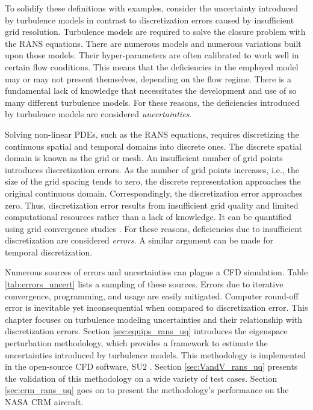 To solidify these definitions with examples, consider the uncertainty introduced by turbulence models in contrast to discretization errors caused by insufficient grid resolution.
Turbulence models are required to solve the closure problem with the RANS equations.
There are numerous models and numerous variations built upon those models. 
Their hyper-parameters are often calibrated to work well in certain flow conditions.
This means that the deficiencies in the employed model may or may not present themselves, depending on the flow regime.
There is a fundamental lack of knowledge that necessitates the development and use of so many different turbulence models.
For these reasons, the deficiencies introduced by turbulence models are considered \textit{uncertainties}.

Solving non-linear PDEs, such as the RANS equations, requires discretizing the continuous spatial and temporal domains into discrete ones.
The discrete spatial domain is known as the grid or mesh.
An insufficient number of grid points introduces discretization errors.
As the number of grid points increases, i.e., the size of the grid spacing tends to zero, the discrete representation approaches the original continuous domain.
Correspondingly, the discretization error approaches zero.
Thus, discretization error results from insufficient grid quality and limited computational resources rather than a lack of knowledge.
It can be quantified using grid convergence studies \cite{american_society_of_mechanical_engineers_standard_2009}.
For these reasons, deficiencies due to insufficient discretization are considered \textit{errors}.
A similar argument can be made for temporal discretization.

Numerous sources of errors and uncertainties can plague a CFD simulation. 
Table \ref{tab:errors_uncert} lists a sampling of these sources.
Errors due to iterative convergence, programming, and usage are easily mitigated.
Computer round-off error is inevitable yet inconsequential when compared to discretization error.
This chapter focuses on turbulence modeling uncertainties and their relationship with discretization errors.
Section \ref{sec:equips_rans_uq} introduces the eigenspace perturbation methodology, which provides a framework to estimate the uncertainties introduced by turbulence models.
This methodology is implemented in the open-source CFD software, SU2 \cite{su2_aiaajournal}.
Section \ref{sec:VandV_rans_uq} presents the validation of this methodology on a wide variety of test cases. 
Section \ref{sec:crm_rans_uq} goes on to present the methodology's performance on the NASA CRM aircraft.  

